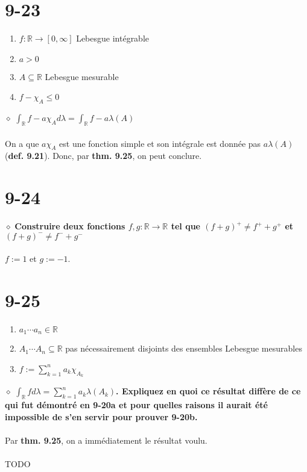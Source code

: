 \documentclass[a4paper,10pt]{article}
\begin{document}
\section*{9-23}
\begin{enumerate}
	\item $f: \mathbb{R} \rightarrow [0, \infty]$ Lebesgue intégrable
	\item $a > 0$
	\item $A \subseteq \mathbb{R}$ Lebesgue mesurable
	\item $f - \chi_A \leq 0$
\end{enumerate}
$\diamond$ \textbf{$\int_\mathbb{R} f - a\chi_A d\lambda = \int_\mathbb{R} f - a \lambda (A)$}
\\
\\
On a que $a\chi_A$ est une fonction simple et son intégrale est donnée pas $a \lambda (A)$ (\textbf{def. 9.21}). Donc, par \textbf{thm. 9.25}, on peut conclure.

\section*{9-24}
$\diamond$ \textbf{Construire deux fonctions $f,g :\mathbb{R} \rightarrow \mathbb{R}$ tel que $(f+g)^+ \neq f^+ + g^+$ et $(f + g)^- \neq f^- + g^-$}
\\
\\
$f := 1$ et $g := -1$.

\section*{9-25}
\begin{enumerate}
	\item $a_1 \cdots a_n \in \mathbb{R}$
	\item $A_1 \cdots A_n \subseteq \mathbb{R}$ pas nécessairement disjoints des ensembles Lebesgue mesurables
	\item $f := \sum_{k=1}^n a_k \chi_{A_k}$
\end{enumerate}
$\diamond$ \textbf{$\int_\mathbb{R} f d\lambda  = \sum_{k=1}^n a_k \lambda (A_k)$. Expliquez en quoi ce résultat diffère de ce qui fut démontré en 9-20a et pour quelles raisons il aurait été impossible de s'en servir pour prouver 9-20b.}
\\
\\
Par \textbf{thm. 9.25}, on a immédiatement le résultat voulu.
\\
\\
TODO
\end{document}
